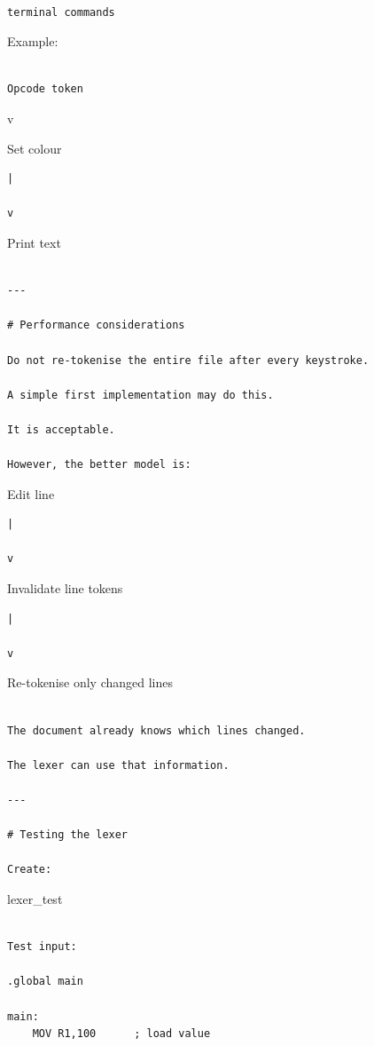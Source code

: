 \documentclass[
  oneside,
  openany]{book}
\begin{document}
\begin{verbatim}

terminal commands
\end{verbatim}

Example:

\begin{verbatim}

Opcode token
\end{verbatim}

v 

Set colour

\begin{verbatim}
|

v
\end{verbatim}

Print text

\begin{verbatim}

---

# Performance considerations

Do not re-tokenise the entire file after every keystroke.

A simple first implementation may do this.

It is acceptable.

However, the better model is:
\end{verbatim}

Edit line

\begin{verbatim}
|

v
\end{verbatim}

Invalidate line tokens

\begin{verbatim}
|

v
\end{verbatim}

Re-tokenise only changed lines

\begin{verbatim}

The document already knows which lines changed.

The lexer can use that information.

---

# Testing the lexer

Create:
\end{verbatim}

lexer\_test

\begin{verbatim}

Test input:

.global main

main:
    MOV R1,100      ; load value
\end{verbatim}
\end{document}

